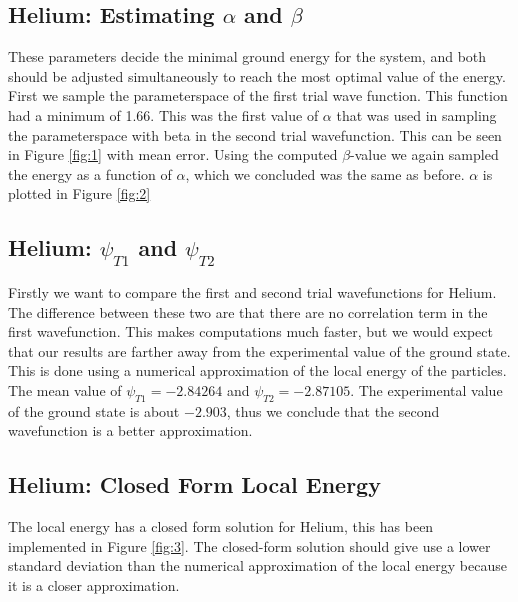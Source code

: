 \documentclass[twocolumn]{article}[10pt]
\begin{document}
\subsection{Helium: Estimating $\alpha$ and $\beta$}
These parameters decide the minimal ground energy for the system, and both
should be adjusted simultaneously to reach the most optimal value of the
energy. First we sample the parameterspace of the first trial wave function. 
This function had a minimum of 1.66. This was the first value of $\alpha$ that was used in sampling the 
parameterspace with beta in the second trial wavefunction. 
This can  be seen in Figure \ref{fig:1} with mean error. 
Using the computed $\beta$-value we again
sampled the energy as a function of $\alpha$, which we concluded was 
the same as before. $\alpha$ is plotted in Figure \ref{fig:2}



\subsection{Helium: $\psi_{T1}$ and $\psi_{T2}$ }
Firstly we want to compare the first and second trial wavefunctions for Helium. 
The difference between these two are that there are no correlation term
in the first wavefunction. This makes computations much faster, but we
would expect that our results are farther away from the experimental 
value of the ground state. This is done using a numerical approximation 
of the local energy of the particles. The mean value of 
$\psi_{T1} = -2.84264$ and $\psi_{T2} = -2.87105$. The experimental value of
the ground state is about $-2.903$, thus we conclude that the second wavefunction is a better approximation.

\subsection{Helium: Closed Form Local Energy}
The local energy has a closed form solution for Helium, this has 
been implemented in Figure \ref{fig:3}. The closed-form solution should
give use a lower standard deviation than the numerical approximation
of the local energy because it is a closer approximation. 
\end{document}
